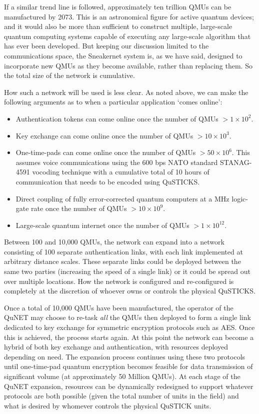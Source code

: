 \documentclass[twocolumn, aps, rmp, amsmath, amssymb, nofootinbib, superscriptaddress, longbibliography, floatfix, table-of-contents, eqsecnum]{revtex4-2}
\begin{document}
If a similar trend line is followed, approximately ten trillion QMUs can be manufactured by 2073. This is an astronomical figure for active quantum devices; and it would also be more than sufficient to construct multiple, large-scale quantum computing systems capable of executing any large-scale algorithm that has ever been developed. But keeping our discussion limited to the communications space, the Sneakernet system is, as we have said, designed to incorporate new QMUs as they become available, rather than replacing them. So the total size of the network is cumulative. 

How such a network will be used is less clear. As noted above, we can make the following arguments as to when a particular application `comes online':
\begin{itemize}
\item Authentication tokens can come online once the number of QMUs $> 1\times 10^2$. 
\item Key exchange can come online once the number of QMUs $> 10\times 10^3$.
\item One-time-pads can come online once the number of QMUs $> 50\times 10^6$. This assumes voice communications using the 600 bps NATO standard STANAG-4591 vocoding technique with a cumulative total of 10 hours of communication that needs to be encoded using QuSTICKS.
\item Direct coupling of fully error-corrected quantum computers at a MHz logic-gate rate once the number of QMUs $> 10\times 10^9$. 
\item Large-scale quantum internet once the number of QMUs $> 1\times 10^{12}$.
\end{itemize}

Between 100 and 10,000 QMUs, the network can expand into a network consisting of 100 separate authentication links, with each link implemented at arbitrary distance scales. These separate links could be deployed between the same two parties (increasing the speed of a single link) or it could be spread out over multiple locations. How the network is configured and re-configured is completely at the discretion of whoever owns or controls the physical QuSTICKS. 

Once a total of 10,000 QMUs have been manufactured, the operator of the QuNET may choose to re-task \textit{all} the QMUs then deployed to form a single link dedicated to key exchange for symmetric encryption protocols such as AES. Once this is achieved, the process starts again. At this point the network can become a hybrid of both key exchange and authentication, with resources deployed depending on need. The expansion process continues using these two protocols until one-time-pad quantum encryption becomes feasible for data transmission of significant volume (at approximately 50 Million QMUs). At each stage of the QuNET expansion, resources can be dynamically redesigned to support whatever protocols are both possible (given the total number of units in the field) and what is desired by whomever controls the physical QuSTICK units. 
\end{document}
